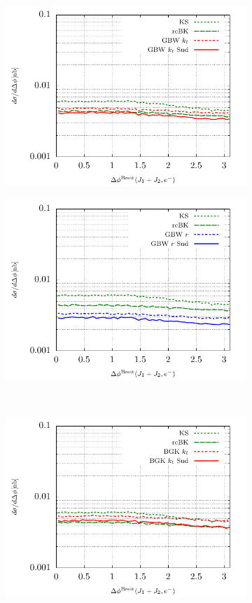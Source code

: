 \documentclass[11pt]{article}
\numberwithin{equation}{section}
\numberwithin{table}{section}
\numberwithin{figure}{section}
\begin{document}
\begin{figure}[p]
\begin{subfigure}{0.5\textwidth}
	\includegraphics[width=\textwidth]{plots/plotGBW2}
	\end{subfigure}
	\begin{subfigure}{0.5\textwidth}
	\includegraphics[width=\textwidth]{plots/plotGBW3}
	\end{subfigure}\\
	\begin{subfigure}{0.5\textwidth}
	\includegraphics[width=\textwidth]{plots/plotBGK2}

\end{subfigure}
\end{figure}
\end{document}
